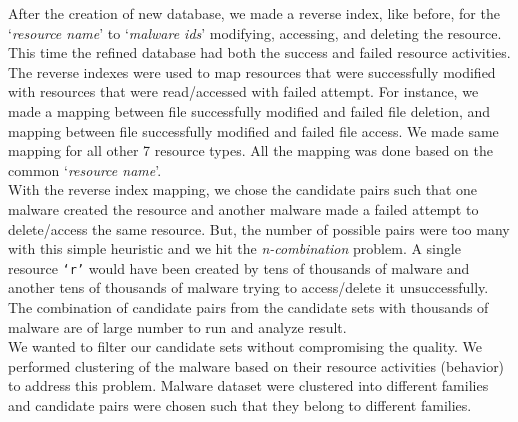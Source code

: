 After the creation of new database, we made a reverse index, like before, for the `\emph{resource name}' to `\emph{malware ids}' modifying, accessing, and deleting the resource.
This time the refined database had both the success and failed resource activities.
The reverse indexes were used to map resources that were successfully modified with resources that were read/accessed with failed attempt.
For instance, we made a mapping between file successfully modified and failed file deletion, and mapping between file successfully modified and failed file access.
We made same mapping for all other 7 resource types.
All the mapping was done based on the common `\emph{resource name}'.\\

With the reverse index mapping, we chose the candidate pairs such that one malware created the resource and another malware made a failed attempt to delete/access the same resource.
But, the number of possible pairs were too many with this simple heuristic and we hit the \emph{n-combination} problem.
A single resource \texttt{`r'} would have been created by tens of thousands of malware and another tens of thousands of malware trying to access/delete it unsuccessfully.
The combination of candidate pairs from the candidate sets with thousands of malware are of large number to run and analyze result.\\

We wanted to filter our candidate sets without compromising the quality.
We performed clustering of the malware based on their resource activities (behavior) to address this problem.
Malware dataset were clustered into different families and candidate pairs were chosen such that they belong to different families.
